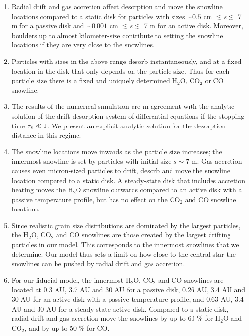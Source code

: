 \documentclass[apj]{emulateapj}
\begin{document}
\begin{enumerate}
\item Radial drift and gas accretion affect desorption and move the snowline locations compared to a static disk for particles with sizes $\sim$$0.5$ cm $\lesssim s \lesssim$ 7 m for a passive disk and $\sim$$0.001$ cm $\lesssim s \lesssim$ 7 m for an active disk. Moreover, boulders up to almost kilometer-size contribute to setting the snowline locations if they are very close to the snowlines.

\item Particles with sizes in the above range desorb instantaneously, and at a fixed location in the disk that only depends on the particle size. Thus for each particle size there is a fixed and uniquely determined H$_2$O, CO$_2$ or CO snowline. 

\item The results of the numerical simulation are in agreement with the analytic solution of the drift-desorption system of differential equations if the stopping time $\tau_{\rm s} \ll 1$. We present an explicit analytic solution for the desorption distance in this regime.  

\item The snowline locations move inwards as the particle size increases; the innermost snowline is set by particles with initial size $s \sim 7$ m. Gas accretion causes even micron-sized particles to drift, desorb and move the snowline location compared to a static disk. A steady-state disk that includes accretion heating moves the H$_2$O snowline outwards compared to an active disk with a passive temperature profile, but has no effect on the CO$_2$ and CO snowline locations.

\item Since realistic grain size distributions are dominated by the largest particles, the H$_2$O, CO$_2$ and CO snowlines are those created by the largest drifting particles in our model. This corresponds to the innermost snowlines that we determine. Our model thus sets a limit on how close to the central star the snowlines can be pushed by radial drift and gas accretion.

\item For our fiducial model, the innermost H$_2$O, CO$_2$ and CO snowlines are located at 0.3 AU, 3.7 AU and 30 AU for a passive disk, 0.26 AU, 3.4 AU and 30 AU for an active disk with a passive temperature profile, and 0.63 AU, 3.4 AU and 30 AU for a steady-state active disk. Compared to a static disk, radial drift and gas accretion move the snowlines by up to 60 \% for H$_2$O and CO$_2$, and by up to 50 \% for CO. 


\end{enumerate}
\end{document}
